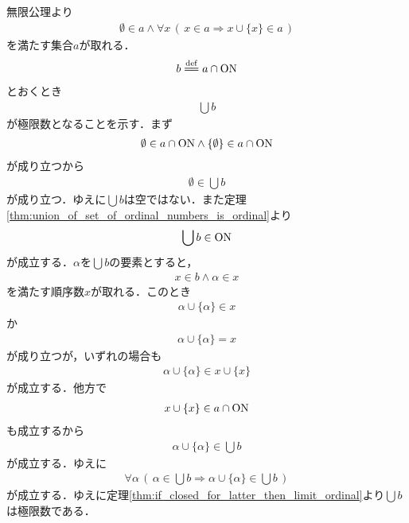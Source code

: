 	\begin{prf}
		無限公理より
		\begin{align}
			\emptyset \in a
			\wedge \forall x\, \left(\, x \in a \Longrightarrow x \cup \{x\} \in a\, \right)
		\end{align}
		を満たす集合$a$が取れる．
		\begin{align}
			b \defeq a \cap \ON
		\end{align}
		とおくとき
		\begin{align}
			\bigcup b
		\end{align}
		が極限数となることを示す．まず
		\begin{align}
			\emptyset \in a \cap \mathrm{ON} \wedge \{\emptyset\} \in a \cap \mathrm{ON}
		\end{align}
		が成り立つから
		\begin{align}
			\emptyset \in \bigcup b
		\end{align}
		が成り立つ．ゆえに$\bigcup b$は空ではない．また定理\ref{thm:union_of_set_of_ordinal_numbers_is_ordinal}より
		\begin{align}
			\bigcup b \in \mathrm{ON}
		\end{align}
		が成立する．$\alpha$を$\bigcup b$の要素とすると，
		\begin{align}
			x \in b \wedge \alpha \in x
		\end{align}
		を満たす順序数$x$が取れる．このとき
		\begin{align}
			\alpha \cup \{\alpha\} \in x
		\end{align}
		か
		\begin{align}
			\alpha \cup \{\alpha\} = x
		\end{align}
		が成り立つが，いずれの場合も
		\begin{align}
			\alpha \cup \{\alpha\} \in x \cup \{x\}
		\end{align}
		が成立する．他方で
		\begin{align}
			x \cup \{x\} \in a \cap \mathrm{ON}
		\end{align}
		も成立するから
		\begin{align}
			\alpha \cup \{\alpha\} \in \bigcup b
		\end{align}
		が成立する．ゆえに
		\begin{align}
			\forall \alpha\, \left(\, \alpha \in \bigcup b \Longrightarrow \alpha \cup \{\alpha\} \in \bigcup b\, \right)
		\end{align}
		が成立する．ゆえに定理\ref{thm:if_closed_for_latter_then_limit_ordinal}より$\bigcup b$は極限数である．
		\QED
	\end{prf}
	
